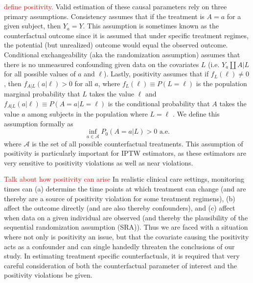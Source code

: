 \documentclass{article}\usepackage[]{graphicx}\usepackage[]{color}
\begin{document}
\textcolor{red}{define positivity.} Valid estimation of these causal parameters
rely on three primary assumptions. Consistency assumes that if the treatment is $A=a$ for a given
subject, then $Y_a=Y$. This assumption is sometimes known as the counterfactual
outcome since it is assumed that under specific treatment regimes, the potential
(but unrealized) outcome would equal the observed outcome. Conditional
exchangeability (aka the randomization assumption) assumes that there is no
unmeasured confounding given data on the covariates $L$ (i.e. $Y_a \coprod A|L$
for all possible values of $a$ and $\ell$). Lastly, positivity assumes that if
$f_L(\ell) \neq 0$, then $f_{A|L}(a|\ell)>0$ for all $a$, where
$f_L(\ell) \equiv P(L=\ell)$ is the population marginal probability that $L$
takes the value $\ell$ and $f_{A|L}(a|\ell) \equiv P(A=a|L=\ell)$ is the
conditional probability that $A$ takes the value $a$ among subjects in the population where $L=\ell$
\cite{Robins:ch23}. We define this assumption formally as
\begin{equation}
	\underset{a \in \mathcal{A}}{\inf}P_0(A=a|L)>0 \text{ a.e.}
\end{equation}
where $\mathcal{A}$ is the set of all possible counterfactual treatments. This
assumption of positivity is particularly important for IPTW estimators, as these
estimators are very sensitive to positivity violations as well as near
violations.
\newline

\textcolor{red}{Talk about how positivity can arise} In realistic clinical care
settings, monitoring times can (a) determine the time points at which treatment 
can change (and are thereby are a source of
positivity violation for some treatment regimens), (b) affect the outcome
directly (and are also thereby confounders), and (c) affect when data on a given
individual are observed (and thereby the plausibility of the sequential
randomization assumption (SRA)). Thus we are faced with a situation where not
only is positivity an issue, but that the covariate causing the positivity acts as a
confounder and can single handedly threaten the conclusions of our study. In
estimating treatment specific counterfactuals, it is required that very careful
consideration of both the counterfactual parameter of interest and the
positivity violations be given.
\newline
\end{document}
